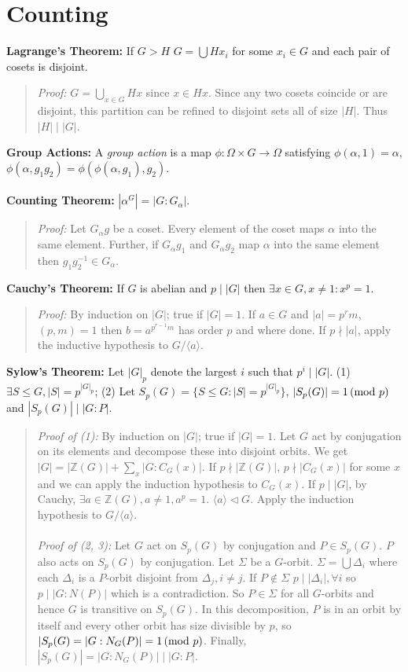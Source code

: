 \section {Counting}
{\bf Lagrange's Theorem:} If $G>H$ $G= \bigcup Hx_i$ for some $x_i \in G$ and each pair of
cosets is disjoint.
\begin{quote}
\emph{Proof:}  $G= \bigcup_{x \in G} Hx$ since $x \in Hx$.  Since any
two cosets coincide or are disjoint, this partition can be refined to disjoint sets all of
size $|H|$.   Thus $|H| \mid |G|$.
\end{quote}
{\bf Group Actions:} A \emph{group action} is a map $\phi: \Omega \times G \rightarrow \Omega$
satisfying $\phi(\alpha,1)= \alpha$, $\phi(\alpha, g_1 g_2)= \phi(\phi(\alpha, g_1), g_2)$.
\\
\\
{\bf Counting Theorem:} $|\alpha^G|= |G:G_{\alpha}|$.
\begin{quote}
\emph{Proof:} Let $G_{\alpha} g$ be a coset.  Every element of the coset maps $\alpha$ into the same element.  Further,
if $G_{\alpha} g_1$ and
$G_{\alpha} g_2$ map $\alpha$ into the same element then
$g_1 g_2^{-1} \in G_{\alpha}$.
\end{quote}
{\bf Cauchy's Theorem:}  If $G$ is abelian and $p \mid |G|$ then $\exists x \in G, x \ne 1: x^p=1$.
\begin{quote}
\emph{Proof:}  By induction on $|G|$; true if $|G|=1$.
If $a \in G$ and $|a|= p^rm$, $(p, m)=1$ then $b=a^{p^{r-1}m}$ has order $p$ and where done.
If $p \nmid |a|$, apply the inductive hypothesis to $G/ \langle a \rangle$.
\end{quote}
{\bf Sylow's Theorem:}  Let $|G|_p$ denote the largest $i$ such that $p^i \mid |G|$.
(1) $\exists S \le G, |S|= p^{|G|_p}$; (2) Let $S_p(G)= \{S \le G: |S|= p^{|G|_p} \}$,
$|S_p(G)| = 1 \thinspace \textnormal{(mod } p \textnormal{)}$ and $|S_p(G)| \mid |G:P|$.
\begin{quote}
\emph{Proof of (1):}  By induction on $|G|$; true if $|G|=1$.
Let $G$ act by conjugation on its elements and decompose these into disjoint orbits.  We get
$|G|= |{\mathbb Z}(G)|+\sum_{x} |G:C_G(x)|$.  If $p \nmid |{\mathbb Z}(G)|$, $p \nmid |C_G(x)|$
for some $x$ and we can apply the induction hypothesis to $C_G(x)$.  If $p \mid |G|$, by Cauchy,
$\exists a \in {\mathbb Z}(G), a \ne 1, a^p =1$.  $\langle a \rangle \lhd G$.  
Apply the induction hypothesis to
$G/ \langle a \rangle$.
\\
\\
\emph{Proof of (2, 3):}
Let $G$ act on $S_p(G)$ by conjugation and $P \in S_p(G)$.  $P$ also acts on $S_p(G)$ by
conjugation.  Let $\Sigma$ be a $G$-orbit.  $\Sigma= \bigcup \Delta_i$ where each
$\Delta_i$ is a $P$-orbit disjoint from $\Delta_j, i \ne j$.  If $P \notin \Sigma$
$p \mid |\Delta_i|, \forall i$ so $p \mid |G:N(P)|$ which is a contradiction.  So $P \in \Sigma$ for
all $G$-orbits and hence $G$ is transitive on $S_p(G)$.  In this decomposition, $P$ is in an orbit
by itself and every other orbit has size divisible by $p$, so $|S_p(G)= |G:N_G(P)| = 1 \thinspace \textnormal{(mod } p \textnormal{)}$.
Finally,
$|S_p(G)| = |G:N_G(P)| \mid |G:P|$.
\end{quote}
